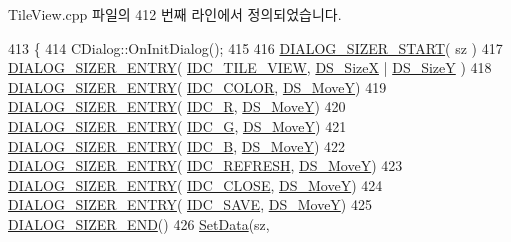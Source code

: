 Tile\+View.\+cpp 파일의 412 번째 라인에서 정의되었습니다.


\begin{DoxyCode}
413 \{
414   CDialog::OnInitDialog();
415   
416   \mbox{\hyperlink{_resize_dlg_8h_acb9d1d22d9838f6dda8a61cfa132997c}{DIALOG\_SIZER\_START}}( sz )
417     \mbox{\hyperlink{_resize_dlg_8h_a0e9ee7a18c54003893895a009f5d79c8}{DIALOG\_SIZER\_ENTRY}}( \mbox{\hyperlink{resource_8h_a091df1e8af92b702472240d05fafd9cc}{IDC\_TILE\_VIEW}}, \mbox{\hyperlink{_resize_dlg_8h_a21713fd373c62604a1ee3d5d831101ad}{DS\_SizeX}} | 
      \mbox{\hyperlink{_resize_dlg_8h_a783821ba6bb984916d55f46cdf90cb2b}{DS\_SizeY}} )
418     \mbox{\hyperlink{_resize_dlg_8h_a0e9ee7a18c54003893895a009f5d79c8}{DIALOG\_SIZER\_ENTRY}}( \mbox{\hyperlink{resource_8h_a611975b03b6d7ce68b2de260b97086d0}{IDC\_COLOR}}, \mbox{\hyperlink{_resize_dlg_8h_ae5309071be822a4dae5cb33a131f6180}{DS\_MoveY}})
419     \mbox{\hyperlink{_resize_dlg_8h_a0e9ee7a18c54003893895a009f5d79c8}{DIALOG\_SIZER\_ENTRY}}( \mbox{\hyperlink{resource_8h_ab801af70383175ec71fd14d356bf9c9d}{IDC\_R}}, \mbox{\hyperlink{_resize_dlg_8h_ae5309071be822a4dae5cb33a131f6180}{DS\_MoveY}})
420     \mbox{\hyperlink{_resize_dlg_8h_a0e9ee7a18c54003893895a009f5d79c8}{DIALOG\_SIZER\_ENTRY}}( \mbox{\hyperlink{resource_8h_a35ca279082796c6a98895939aa06826d}{IDC\_G}}, \mbox{\hyperlink{_resize_dlg_8h_ae5309071be822a4dae5cb33a131f6180}{DS\_MoveY}})
421     \mbox{\hyperlink{_resize_dlg_8h_a0e9ee7a18c54003893895a009f5d79c8}{DIALOG\_SIZER\_ENTRY}}( \mbox{\hyperlink{resource_8h_a96306052e53348b1e760b8dcabf2b0c7}{IDC\_B}}, \mbox{\hyperlink{_resize_dlg_8h_ae5309071be822a4dae5cb33a131f6180}{DS\_MoveY}})
422     \mbox{\hyperlink{_resize_dlg_8h_a0e9ee7a18c54003893895a009f5d79c8}{DIALOG\_SIZER\_ENTRY}}( \mbox{\hyperlink{resource_8h_ab2f366ad34063a7be9de1e2249dc705a}{IDC\_REFRESH}}, \mbox{\hyperlink{_resize_dlg_8h_ae5309071be822a4dae5cb33a131f6180}{DS\_MoveY}})
423     \mbox{\hyperlink{_resize_dlg_8h_a0e9ee7a18c54003893895a009f5d79c8}{DIALOG\_SIZER\_ENTRY}}( \mbox{\hyperlink{resource_8h_a27e7224faecfa4040c695a69107088f9}{IDC\_CLOSE}}, \mbox{\hyperlink{_resize_dlg_8h_ae5309071be822a4dae5cb33a131f6180}{DS\_MoveY}})
424     \mbox{\hyperlink{_resize_dlg_8h_a0e9ee7a18c54003893895a009f5d79c8}{DIALOG\_SIZER\_ENTRY}}( \mbox{\hyperlink{resource_8h_a305f8d6fb810f32b99a97396ac92f9d5}{IDC\_SAVE}}, \mbox{\hyperlink{_resize_dlg_8h_ae5309071be822a4dae5cb33a131f6180}{DS\_MoveY}})
425     \mbox{\hyperlink{_resize_dlg_8h_aeac0c1e32f30e0763df5736e4b3ea50a}{DIALOG\_SIZER\_END}}()
426     \mbox{\hyperlink{class_resize_dlg_a6a3965f44a0c2f5ba9aaa798a9a81df5}{SetData}}(sz,

\end{DoxyCode}
